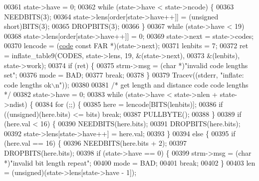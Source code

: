 \begin{DoxyCode}
{{{{{{{{00361             state->have = 0;
00362             \textcolor{keywordflow}{while} (state->have < state->ncode) \{
00363                 NEEDBITS(3);
00364                 state->lens[order[state->have++]] = (\textcolor{keywordtype}{unsigned} short)BITS(3);
00365                 DROPBITS(3);
00366             \}
00367             \textcolor{keywordflow}{while} (state->have < 19)
00368                 state->lens[order[state->have++]] = 0;
00369             state->next = state->codes;
00370             lencode = (\hyperlink{structcode}{code} \textcolor{keyword}{const} FAR *)(state->next);
00371             lenbits = 7;
00372             ret = inflate\_table9(CODES, state->lens, 19, &(state->next),
00373                                 &(lenbits), state->work);
00374             \textcolor{keywordflow}{if} (ret) \{
00375                 strm->msg = (\textcolor{keywordtype}{char} *)\textcolor{stringliteral}{"invalid code lengths set"};
00376                 mode = BAD;
00377                 \textcolor{keywordflow}{break};
00378             \}
00379             Tracev((stderr, \textcolor{stringliteral}{"inflate:       code lengths ok\(\backslash\)n"}));
00380 
00381             \textcolor{comment}{/* get length and distance code code lengths */}
00382             state->have = 0;
00383             \textcolor{keywordflow}{while} (state->have < state->nlen + state->ndist) \{
00384                 \textcolor{keywordflow}{for} (;;) \{
00385                     here = lencode[BITS(lenbits)];
00386                     \textcolor{keywordflow}{if} ((\textcolor{keywordtype}{unsigned})(here.bits) <= bits) \textcolor{keywordflow}{break};
00387                     PULLBYTE();
00388                 \}
00389                 \textcolor{keywordflow}{if} (here.val < 16) \{
00390                     NEEDBITS(here.bits);
00391                     DROPBITS(here.bits);
00392                     state->lens[state->have++] = here.val;
00393                 \}
00394                 \textcolor{keywordflow}{else} \{
00395                     \textcolor{keywordflow}{if} (here.val == 16) \{
00396                         NEEDBITS(here.bits + 2);
00397                         DROPBITS(here.bits);
00398                         \textcolor{keywordflow}{if} (state->have == 0) \{
00399                             strm->msg = (\textcolor{keywordtype}{char} *)\textcolor{stringliteral}{"invalid bit length repeat"};
00400                             mode = BAD;
00401                             \textcolor{keywordflow}{break};
00402                         \}
00403                         len = (unsigned)(state->lens[state->have - 1]);
}}}}}}}}
\end{DoxyCode}
